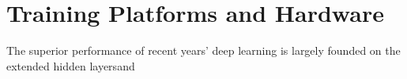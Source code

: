\section{Training Platforms and Hardware}
The superior performance of recent years' deep learning is largely founded on the extended hidden layersand 